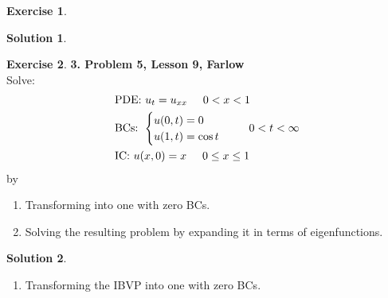 \documentclass{book}
\theoremstyle{definition}
\newtheorem*{exer*}{Exercise}
\newtheorem*{sln*}{Solution}
\begin{document}
\begin{exer*}
\begin{sln*}
	\end{sln*}
	
	
\end{exer*}

\newpage

\begin{exer*}\textbf{3. Problem 5, Lesson 9, Farlow}\\
	
	
	Solve:
	\begin{align*}
	&\text{PDE: } u_t = u_{xx}\hspace{0.5cm} 0 < x < 1\\
	&\text{BCs: } \begin{cases}
	u(0,t) = 0\\
	u(1,t) = \cos t
	\end{cases}\hspace{0.5cm} 0 < t < \infty\\
	&\text{IC: } u(x,0) = x\hspace{0.5cm}0\leq x\leq 1
	\end{align*}
	by
	
	\begin{enumerate}
		\item Transforming into one with zero BCs.\\
		\item Solving the resulting problem by expanding it in terms of eigenfunctions.\\
	\end{enumerate}
	
	
	
	
	\begin{sln*}
		$\,$
		\begin{enumerate}
			\item Transforming the IBVP into one with zero BCs.\\
			

\end{enumerate}
\end{sln*}
\end{exer*}
\end{document}
